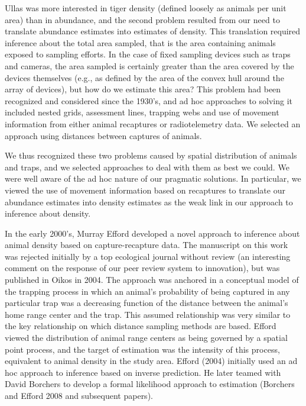 Ullas was more interested in tiger density (defined
loosely as animals per unit area) than in abundance, and the second
problem resulted from our need to translate abundance estimates into
estimates of density.  This translation required inference about the
total area sampled, that is the area containing animals exposed to
sampling efforts. In the case of fixed sampling devices such as traps
and cameras, the area sampled is certainly greater than the area
covered by the devices themselves (e.g., as defined by the area of the
convex hull around the array of devices), but how do we estimate this
area?  This problem had been recognized and considered since the
1930's, and ad hoc approaches to solving it included nested grids,
assessment lines, trapping webs and use of movement information from
either animal recaptures or radiotelemetry data. We selected an
approach using distances between captures of animals.  

We thus
recognized these two problems caused by spatial distribution of
animals and traps, and we selected approaches to deal with them as
best we could. We were well aware of the ad hoc nature of our
pragmatic solutions. In particular, we viewed the use of movement
information based on recaptures to translate our abundance estimates
into density estimates as the weak link in our approach to inference
about density. 

 In the early 2000's, Murray Efford developed a novel
approach to inference about animal density based on capture-recapture
data. The manuscript on this work was rejected initially by a top
ecological journal without review (an interesting comment on the
response of our peer review system to innovation), but was published
in Oikos in 2004. The approach was anchored in a conceptual model of
the trapping process in which an animal's probability of being
captured in any particular trap was a decreasing function of the
distance between the animal's home range center and the trap. This
assumed relationship was very similar to the key relationship on which
distance sampling methods are based. Efford viewed the distribution of
animal range centers as being governed by a spatial point process, and
the target of estimation was the intensity of this process, equivalent
to animal density in the study area. Efford (2004) initially used an
ad hoc approach to inference based on inverse prediction. He later
teamed with David Borchers to develop a formal likelihood approach to
estimation (Borchers and Efford 2008 and subsequent papers).  


